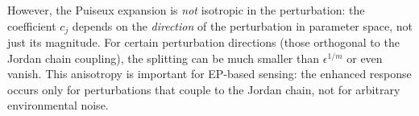 However, the Puiseux expansion is \emph{not} isotropic in the
perturbation: the coefficient $c_j$ depends on the \emph{direction} of
the perturbation in parameter space, not just its magnitude. For
certain perturbation directions (those orthogonal to the Jordan chain
coupling), the splitting can be much smaller than $\epsilon^{1/m}$ or
even vanish. This anisotropy is important for EP-based sensing: the
enhanced response occurs only for perturbations that couple to the
Jordan chain, not for arbitrary environmental noise.
